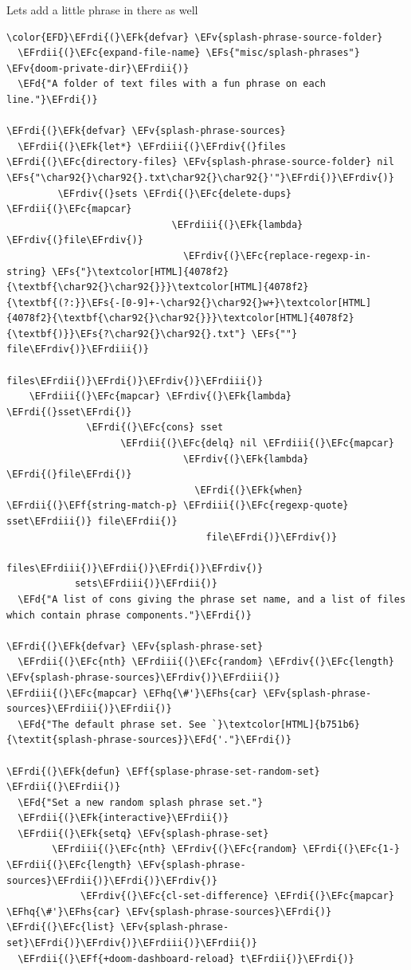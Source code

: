 \documentclass{scrartcl}
\newcommand{\EFk}[1]{\textcolor{EFk}{#1}} %
\newcommand{\EFd}[1]{\textcolor{EFd}{\textit{#1}}} %
\newcommand{\EFs}[1]{\textcolor{EFs}{#1}} %
\newcommand{\EFc}[1]{\textcolor{EFc}{#1}} %
\newcommand{\EFv}[1]{\textcolor{EFv}{#1}} %
\newcommand{\EFf}[1]{\textcolor{EFf}{#1}} %
\newcommand{\EFhq}[1]{\textcolor{EFhq}{#1}} %
\newcommand{\EFhs}[1]{\textcolor{EFhs}{#1}} %
\newcommand{\EFrdi}[1]{\textcolor{EFrdi}{#1}} %
\newcommand{\EFrdii}[1]{\textcolor{EFrdii}{#1}} %
\newcommand{\EFrdiii}[1]{\textcolor{EFrdiii}{#1}} %
\newcommand{\EFrdiv}[1]{\textcolor{EFrdiv}{#1}} %
\begin{document}
Lets add a little phrase in there as well
\begin{Code}
\begin{Verbatim}[]
\color{EFD}\EFrdi{(}\EFk{defvar} \EFv{splash-phrase-source-folder}
  \EFrdii{(}\EFc{expand-file-name} \EFs{"misc/splash-phrases"} \EFv{doom-private-dir}\EFrdii{)}
  \EFd{"A folder of text files with a fun phrase on each line."}\EFrdi{)}

\EFrdi{(}\EFk{defvar} \EFv{splash-phrase-sources}
  \EFrdii{(}\EFk{let*} \EFrdiii{(}\EFrdiv{(}files \EFrdi{(}\EFc{directory-files} \EFv{splash-phrase-source-folder} nil \EFs{"\char92{}\char92{}.txt\char92{}\char92{}'"}\EFrdi{)}\EFrdiv{)}
         \EFrdiv{(}sets \EFrdi{(}\EFc{delete-dups} \EFrdii{(}\EFc{mapcar}
                             \EFrdiii{(}\EFk{lambda} \EFrdiv{(}file\EFrdiv{)}
                               \EFrdiv{(}\EFc{replace-regexp-in-string} \EFs{"}\textcolor[HTML]{4078f2}{\textbf{\char92{}\char92{}}}\textcolor[HTML]{4078f2}{\textbf{(?:}}\EFs{-[0-9]+-\char92{}\char92{}w+}\textcolor[HTML]{4078f2}{\textbf{\char92{}\char92{}}}\textcolor[HTML]{4078f2}{\textbf{)}}\EFs{?\char92{}\char92{}.txt"} \EFs{""} file\EFrdiv{)}\EFrdiii{)}
                             files\EFrdii{)}\EFrdi{)}\EFrdiv{)}\EFrdiii{)}
    \EFrdiii{(}\EFc{mapcar} \EFrdiv{(}\EFk{lambda} \EFrdi{(}sset\EFrdi{)}
              \EFrdi{(}\EFc{cons} sset
                    \EFrdii{(}\EFc{delq} nil \EFrdiii{(}\EFc{mapcar}
                               \EFrdiv{(}\EFk{lambda} \EFrdi{(}file\EFrdi{)}
                                 \EFrdi{(}\EFk{when} \EFrdii{(}\EFf{string-match-p} \EFrdiii{(}\EFc{regexp-quote} sset\EFrdiii{)} file\EFrdii{)}
                                   file\EFrdi{)}\EFrdiv{)}
                               files\EFrdiii{)}\EFrdii{)}\EFrdi{)}\EFrdiv{)}
            sets\EFrdiii{)}\EFrdii{)}
  \EFd{"A list of cons giving the phrase set name, and a list of files which contain phrase components."}\EFrdi{)}

\EFrdi{(}\EFk{defvar} \EFv{splash-phrase-set}
  \EFrdii{(}\EFc{nth} \EFrdiii{(}\EFc{random} \EFrdiv{(}\EFc{length} \EFv{splash-phrase-sources}\EFrdiv{)}\EFrdiii{)} \EFrdiii{(}\EFc{mapcar} \EFhq{\#'}\EFhs{car} \EFv{splash-phrase-sources}\EFrdiii{)}\EFrdii{)}
  \EFd{"The default phrase set. See `}\textcolor[HTML]{b751b6}{\textit{splash-phrase-sources}}\EFd{'."}\EFrdi{)}

\EFrdi{(}\EFk{defun} \EFf{splase-phrase-set-random-set} \EFrdii{(}\EFrdii{)}
  \EFd{"Set a new random splash phrase set."}
  \EFrdii{(}\EFk{interactive}\EFrdii{)}
  \EFrdii{(}\EFk{setq} \EFv{splash-phrase-set}
        \EFrdiii{(}\EFc{nth} \EFrdiv{(}\EFc{random} \EFrdi{(}\EFc{1-} \EFrdii{(}\EFc{length} \EFv{splash-phrase-sources}\EFrdii{)}\EFrdi{)}\EFrdiv{)}
             \EFrdiv{(}\EFc{cl-set-difference} \EFrdi{(}\EFc{mapcar} \EFhq{\#'}\EFhs{car} \EFv{splash-phrase-sources}\EFrdi{)} \EFrdi{(}\EFc{list} \EFv{splash-phrase-set}\EFrdi{)}\EFrdiv{)}\EFrdiii{)}\EFrdii{)}
  \EFrdii{(}\EFf{+doom-dashboard-reload} t\EFrdii{)}\EFrdi{)}


\end{Verbatim}
\end{Code}
\end{document}
